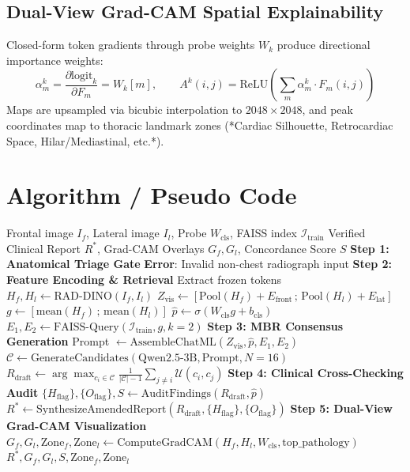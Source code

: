 \documentclass[12pt,a4paper]{report}
\begin{document}
\section{Dual-View Grad-CAM Spatial Explainability}
Closed-form token gradients through probe weights $W_k$ produce directional importance weights:
\begin{equation}
\alpha_m^k = \frac{\partial \text{logit}_k}{\partial F_m} = W_k[m], \qquad A^k(i, j) = \text{ReLU}\left( \sum_m \alpha_m^k \cdot F_m(i, j) \right)
\end{equation}
Maps are upsampled via bicubic interpolation to $2048 \times 2048$, and peak coordinates map to thoracic landmark zones (*Cardiac Silhouette, Retrocardiac Space, Hilar/Mediastinal, etc.*).

\chapter{Algorithm / Pseudo Code}

\begin{algorithm}[H]
\caption{Dual-View RAG-VLM Report Generation and Verification Pipeline}
\begin{algorithmic}[1]
\Require Frontal image $I_f$, Lateral image $I_l$, Probe $W_{\text{cls}}$, FAISS index $\mathcal{I}_{\text{train}}$
\Ensure Verified Clinical Report $R^*$, Grad-CAM Overlays $G_f, G_l$, Concordance Score $S$
\State \textbf{Step 1: Anatomical Triage Gate}
    \State \Return \textbf{Error}: Invalid non-chest radiograph input
\EndIf
\State \textbf{Step 2: Feature Encoding \& Retrieval}
\State Extract frozen tokens $H_f, H_l \leftarrow \text{RAD-DINO}(I_f, I_l)$
\State $Z_{\text{vis}} \leftarrow [\text{Pool}(H_f) + E_{\text{front}} \,;\, \text{Pool}(H_l) + E_{\text{lat}}]$
\State $g \leftarrow [\text{mean}(H_f) \,;\, \text{mean}(H_l)]$
\State $\hat{p} \leftarrow \sigma(W_{\text{cls}} g + b_{\text{cls}})$
\State $E_1, E_2 \leftarrow \text{FAISS-Query}(\mathcal{I}_{\text{train}}, g, k=2)$
\State \textbf{Step 3: MBR Consensus Generation}
\State Prompt $\leftarrow \text{AssembleChatML}(Z_{\text{vis}}, \hat{p}, E_1, E_2)$
\State $\mathcal{C} \leftarrow \text{GenerateCandidates}(\text{Qwen2.5-3B}, \text{Prompt}, N=16)$
\State $R_{\text{draft}} \leftarrow \arg\max_{c_i \in \mathcal{C}} \frac{1}{|\mathcal{C}|-1}\sum_{j \neq i} \mathcal{U}(c_i, c_j)$
\State \textbf{Step 4: Clinical Cross-Checking Audit}
\State $\{H_{\text{flag}}\}, \{O_{\text{flag}}\}, S \leftarrow \text{AuditFindings}(R_{\text{draft}}, \hat{p})$
\State $R^* \leftarrow \text{SynthesizeAmendedReport}(R_{\text{draft}}, \{H_{\text{flag}}\}, \{O_{\text{flag}}\})$
\State \textbf{Step 5: Dual-View Grad-CAM Visualization}
\State $G_f, G_l, \text{Zone}_f, \text{Zone}_l \leftarrow \text{ComputeGradCAM}(H_f, H_l, W_{\text{cls}}, \text{top\_pathology})$
\State \Return $R^*, G_f, G_l, S, \text{Zone}_f, \text{Zone}_l$
\end{algorithmic}
\end{algorithm}
\end{document}

